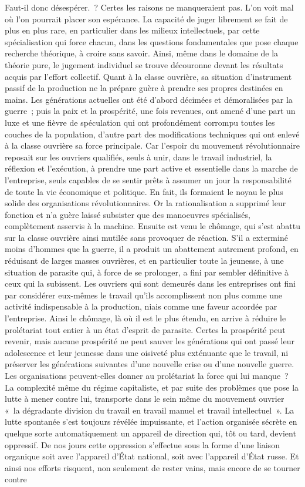 \documentclass[french,twoside]{book} %
\begin{document}
Faut-il donc désespérer. ? Certes les raisons ne manqueraient pas. L'on voit mal où l'on pourrait placer son espérance. La capacité de juger librement se fait de plus en plus rare, en particulier dans les milieux intellectuels, par cette spécialisation qui force chacun, dans les questions fondamentales que pose chaque recherche théorique, à croire sans savoir. Ainsi, même dans le domaine de la théorie pure, le jugement individuel se trouve découronne devant les résultats acquis par l'effort collectif. Quant à la classe ouvrière, sa situation d'instrument passif de la production ne la prépare guère à prendre ses propres destinées en mains. Les générations actuelles ont été d'abord décimées et démoralisées par la guerre ; puis la paix et la prospérité, une fois revenues, ont amené d'une part un luxe et une fièvre de spéculation qui ont profondément corrompu toutes les couches de la population, d'autre part des modifications techniques qui ont enlevé à la classe ouvrière sa force principale. Car l'espoir du mouvement révolutionnaire reposait sur les ouvriers qualifiés, seuls à unir, dans le travail industriel, la réflexion et l'exécution, à prendre une part active et essentielle dans la marche de l'entreprise, seuls capables de se sentir prêts à assumer un jour la responsabilité de toute la vie économique et politique. En fait, ils formaient le noyau le plus solide des organisations révolutionnaires. Or la rationalisation a supprimé leur fonction et n'a guère laissé subsister que des manoeuvres spécialisés, complètement asservis à la machine. Ensuite est venu le chômage, qui s'est abattu sur la classe ouvrière ainsi mutilée sans provoquer de réaction. S'il a exterminé moins d'hommes que la guerre, il a produit un abattement autrement profond, en réduisant de larges masses ouvrières, et en particulier toute la jeunesse, à une situation de parasite qui, à force de se prolonger, a fini par sembler définitive à ceux qui la subissent. Les ouvriers qui sont demeurés dans les entreprises ont fini par considérer eux-mêmes le travail qu'ils accomplissent non plus comme une activité indispensable à la production, niais comme une faveur accordée par l'entreprise. Ainsi le chômage, là où il est le plus étendu, en arrive à réduire le prolétariat tout entier à un état d'esprit de parasite. Certes la prospérité peut revenir, mais aucune prospérité ne peut sauver les générations qui ont passé leur adolescence et leur jeunesse dans une oisiveté plus exténuante que le travail, ni préserver les générations suivantes d'une nouvelle crise ou d'une nouvelle guerre. Les organisations peuvent-elles donner au prolétariat la force qui lui manque ? La complexité même du régime capitaliste, et par suite des problèmes que pose la lutte à mener contre lui, transporte dans le sein même du mouvement ouvrier « la dégradante division du travail en travail manuel et travail intellectuel ». La lutte spontanée s'est toujours révélée impuissante, et l'action organisée sécrète en quelque sorte automatiquement un appareil de direction qui, tôt ou tard, devient oppressif. De nos jours cette oppression s'effectue sous la forme d'une liaison organique soit avec l'appareil d'État national, soit avec l'appareil d'État russe. Et ainsi nos efforts risquent, non seulement de rester vains, mais encore de se tourner contre 
\end{document}
